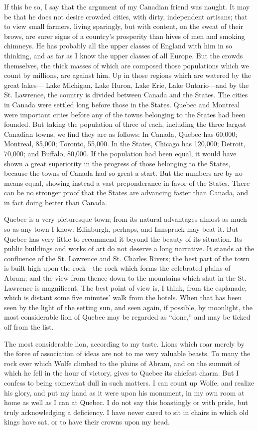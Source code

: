 If this be so, I say that the argument of my Canadian friend was
naught.  It may be that he does not desire crowded cities, with
dirty, independent artisans; that to view small farmers, living
sparingly, but with content, on the sweat of their brows, are surer
signs of a country's prosperity than hives of men and smoking
chimneys.  He has probably all the upper classes of England with
him in so thinking, and as far as I know the upper classes of all
Europe.  But the crowds themselves, the thick masses of which are
composed those populations which we count by millions, are against
him.  Up in those regions which are watered by the great lakes---%
Lake Michigan, Lake Huron, Lake Erie, Lake Ontario---and by the St.
Lawrence, the country is divided between Canada and the States.
The cities in Canada were settled long before those in the States.
Quebec and Montreal were important cities before any of the towns
belonging to the States had been founded.  But taking the
population of three of each, including the three largest Canadian
towns, we find they are as follows: In Canada, Quebec has 60,000;
Montreal, 85,000; Toronto, 55,000.  In the States, Chicago has
120,000; Detroit, 70,000; and Buffalo, 80,000.  If the population
had been equal, it would have shown a great superiority in the
progress of those belonging to the States, because the towns of
Canada had so great a start.  But the numbers are by no means
equal, showing instead a vast preponderance in favor of the States.
There can be no stronger proof that the States are advancing faster
than Canada, and in fact doing better than Canada.

Quebec is a very picturesque town; from its natural advantages
almost as much so as any town I know.  Edinburgh, perhaps, and
Innspruck may beat it.  But Quebec has very little to recommend it
beyond the beauty of its situation.  Its public buildings and works
of art do not deserve a long narrative.  It stands at the
confluence of the St. Lawrence and St. Charles Rivers; the best
part of the town is built high upon the rock---the rock which forms
the celebrated plains of Abram; and the view from thence down to
the mountains which shut in the St. Lawrence is magnificent.  The
best point of view is, I think, from the esplanade, which is
distant some five minutes' walk from the hotels.  When that has
been seen by the light of the setting sun, and seen again, if
possible, by moonlight, the most considerable lion of Quebec may be
regarded as ``done,'' and may be ticked off from the list.

The most considerable lion, according to my taste.  Lions which
roar merely by the force of association of ideas are not to me very
valuable beasts.  To many the rock over which Wolfe climbed to the
plains of Abram, and on the summit of which he fell in the hour of
victory, gives to Quebec its chiefest charm.  But I confess to
being somewhat dull in such matters.  I can count up Wolfe, and
realize his glory, and put my hand as it were upon his monument, in
my own room at home as well as I can at Quebec.  I do not say this
boastingly or with pride, but truly acknowledging a deficiency.  I
have never cared to sit in chairs in which old kings have sat, or
to have their crowns upon my head.

